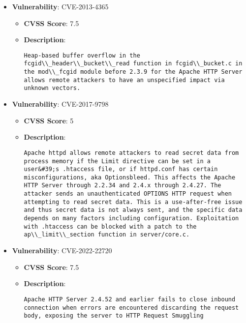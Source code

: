\documentclass{article}
\begin{document}
\begin{itemize}
        \item \textbf{Vulnerability}: CVE-2013-4365
        \begin{itemize}
            \item \textbf{CVSS Score}:  7.5 
            \item \textbf{Description}:
            \parbox[t]{0.9\linewidth}{
                \verb|Heap-based buffer overflow in the fcgid\\_header\\_bucket\\_read function in fcgid\\_bucket.c in the mod\\_fcgid module before 2.3.9 for the Apache HTTP Server allows remote attackers to have an unspecified impact via unknown vectors.|
            }
        \end{itemize}
    
        \item \textbf{Vulnerability}: CVE-2017-9798
        \begin{itemize}
            \item \textbf{CVSS Score}:  5 
            \item \textbf{Description}:
            \parbox[t]{0.9\linewidth}{
                \verb|Apache httpd allows remote attackers to read secret data from process memory if the Limit directive can be set in a user&#39;s .htaccess file, or if httpd.conf has certain misconfigurations, aka Optionsbleed. This affects the Apache HTTP Server through 2.2.34 and 2.4.x through 2.4.27. The attacker sends an unauthenticated OPTIONS HTTP request when attempting to read secret data. This is a use-after-free issue and thus secret data is not always sent, and the specific data depends on many factors including configuration. Exploitation with .htaccess can be blocked with a patch to the ap\\_limit\\_section function in server/core.c.|
            }
        \end{itemize}
    
        \item \textbf{Vulnerability}: CVE-2022-22720
        \begin{itemize}
            \item \textbf{CVSS Score}:  7.5 
            \item \textbf{Description}:
            \parbox[t]{0.9\linewidth}{
                \verb|Apache HTTP Server 2.4.52 and earlier fails to close inbound connection when errors are encountered discarding the request body, exposing the server to HTTP Request Smuggling|
            }
        \end{itemize}
    

\end{itemize}
\end{document}
